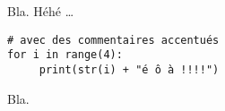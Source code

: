 \documentclass[a4paper]{article}
\begin{document}
Bla. Héhé \dots

\lstset{language=Python}
\begin{lstlisting}
# avec des commentaires accentués
for i in range(4):
     print(str(i) + "é ô à !!!!")
\end{lstlisting}

Bla.
\end{document}
